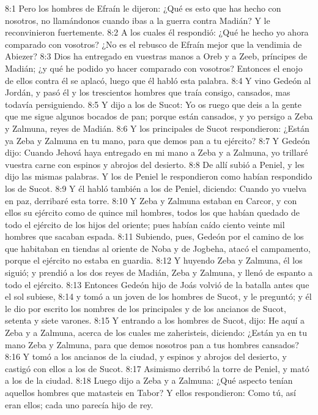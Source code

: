 8:1 Pero los hombres de Efraín le dijeron: ¿Qué es esto que has hecho con nosotros, no llamándonos cuando ibas a la guerra contra Madián? Y le reconvinieron fuertemente.  
8:2 A los cuales él respondió: ¿Qué he hecho yo ahora comparado con vosotros? ¿No es el rebusco de Efraín mejor que la vendimia de Abiezer?  
8:3 Dios ha entregado en vuestras manos a Oreb y a Zeeb, príncipes de Madián; ¿y qué he podido yo hacer comparado con vosotros? Entonces el enojo de ellos contra él se aplacó, luego que él habló esta palabra.  
8:4 Y vino Gedeón al Jordán, y pasó él y los trescientos hombres que traía consigo, cansados, mas todavía persiguiendo.  
8:5 Y dijo a los de Sucot: Yo os ruego que deis a la gente que me sigue algunos bocados de pan; porque están cansados, y yo persigo a Zeba y Zalmuna, reyes de Madián.  
8:6 Y los principales de Sucot respondieron: ¿Están ya Zeba y Zalmuna en tu mano, para que demos pan a tu ejército?  
8:7 Y Gedeón dijo: Cuando Jehová haya entregado en mi mano a Zeba y a Zalmuna, yo trillaré vuestra carne con espinos y abrojos del desierto.  
8:8 De allí subió a Peniel, y les dijo las mismas palabras. Y los de Peniel le respondieron como habían respondido los de Sucot.  
8:9 Y él habló también a los de Peniel, diciendo: Cuando yo vuelva en paz, derribaré esta torre.  
8:10 Y Zeba y Zalmuna estaban en Carcor, y con ellos su ejército como de quince mil hombres, todos los que habían quedado de todo el ejército de los hijos del oriente; pues habían caído ciento veinte mil hombres que sacaban espada.  
8:11 Subiendo, pues, Gedeón por el camino de los que habitaban en tiendas al oriente de Noba y de Jogbeha, atacó el campamento, porque el ejército no estaba en guardia.  
8:12 Y huyendo Zeba y Zalmuna, él los siguió; y prendió a los dos reyes de Madián, Zeba y Zalmuna, y llenó de espanto a todo el ejército.  
8:13 Entonces Gedeón hijo de Joás volvió de la batalla antes que el sol subiese,  
8:14 y tomó a un joven de los hombres de Sucot, y le preguntó; y él le dio por escrito los nombres de los principales y de los ancianos de Sucot, setenta y siete varones.  
8:15 Y entrando a los hombres de Sucot, dijo: He aquí a Zeba y a Zalmuna, acerca de los cuales me zaheristeis, diciendo: ¿Están ya en tu mano Zeba y Zalmuna, para que demos nosotros pan a tus hombres cansados?  
8:16 Y tomó a los ancianos de la ciudad, y espinos y abrojos del desierto, y castigó con ellos a los de Sucot.  
8:17 Asimismo derribó la torre de Peniel, y mató a los de la ciudad.  
8:18 Luego dijo a Zeba y a Zalmuna: ¿Qué aspecto tenían aquellos hombres que matasteis en Tabor? Y ellos respondieron: Como tú, así eran ellos; cada uno parecía hijo de rey.  
